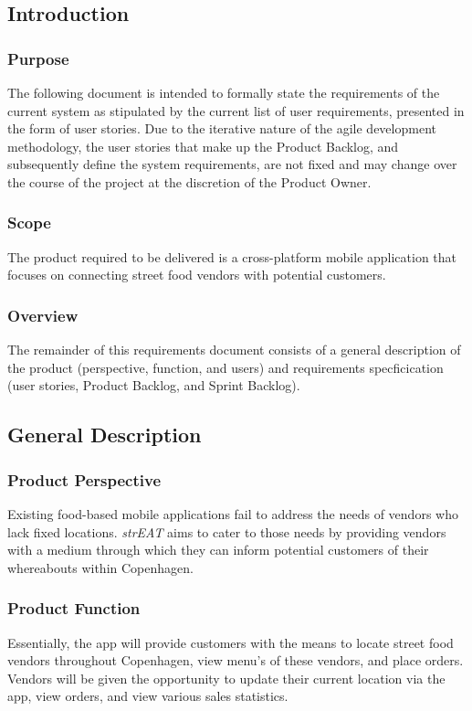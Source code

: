 \subsection{Introduction}
\subsubsection{Purpose}
The following document is intended to formally state the requirements of the current system as stipulated by the current list of user requirements, presented in the form of user stories. Due to the iterative nature of the agile development methodology, the user stories that make up the Product Backlog, and subsequently define the system requirements, are not fixed and may change over the course of the project at the discretion of the Product Owner.
\subsubsection{Scope}
The product required to be delivered is a cross-platform mobile application that focuses on connecting street food vendors with potential customers.
\subsubsection{Overview}
The remainder of this requirements document consists of a general description of the product (perspective, function, and users) and requirements specficication (user stories, Product Backlog, and Sprint Backlog).
\subsection{General Description}
\subsubsection{Product Perspective}
Existing food-based mobile applications fail to address the needs of vendors who lack fixed locations. \textit{strEAT} aims to cater to those needs by providing vendors with a medium through which they can inform potential customers of their whereabouts within Copenhagen.
\subsubsection{Product Function}
Essentially, the app will provide customers with the means to locate street food vendors throughout Copenhagen, view menu's of these vendors, and place orders. Vendors will be given the opportunity to update their current location via the app, view orders, and view various sales statistics.
